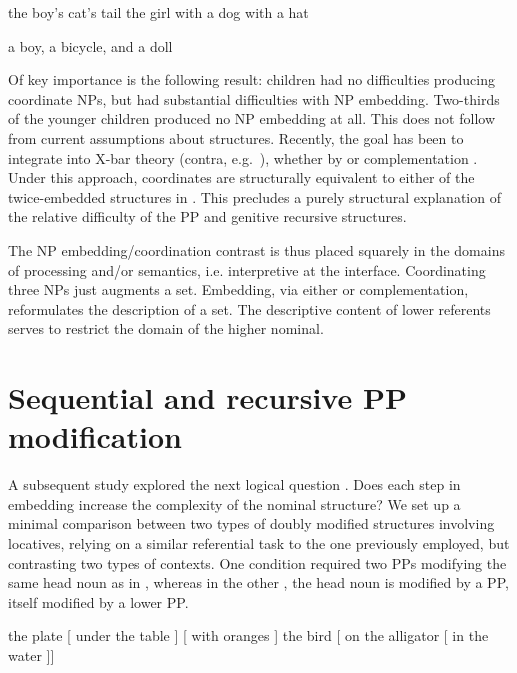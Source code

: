 \documentclass[output=paper]{langsci/langscibook}
\begin{document}
\ea\label{ex:key:1}
    \ea\label{ex:key:1a} the boy’s cat’s tail
    \ex\label{ex:key:1b} the girl with a dog with a hat
    \z
\z

\ea\label{ex:key:2}
    a boy, a bicycle, and a doll
\z

Of key importance is the following result: children had no difficulties
producing coordinate NPs, but had substantial difficulties with NP embedding.
Two-thirds of the younger children produced no NP embedding at all. This does
not follow from current assumptions about  structures.
Recently, the goal has been to integrate  into X-bar theory
(contra, e.g.\ \citealt{Jackendoff1977}), whether by  \citep{Munn1993}
or complementation \citep{Johannessen1998}. Under this approach, coordinates
are structurally equivalent to either of the twice-embedded structures in
. This precludes a purely structural explanation of the relative
difficulty of the PP and genitive recursive
structures.

The NP embedding/coordination contrast is thus placed squarely in the domains
of processing and/or semantics, i.e. interpretive  at the interface.
Coordinating three NPs just augments a set. Embedding, via either  or
complementation, reformulates the description of a set. The descriptive content
of lower referents serves to restrict the domain of the higher nominal.

\section{Sequential and recursive PP modification}

A subsequent study explored the next logical question
\parencite{Perez-LerouxEtAl2018b}. Does each step in embedding increase the
complexity of the nominal structure? We set up a minimal comparison between two
types of doubly modified structures involving locatives, relying on a similar
referential task to the one previously employed, but contrasting two types of
contexts. One condition required two PPs modifying the same head noun as in
, whereas in the other , the head noun is
modified by a PP, itself modified by a lower PP.

\ea\label{ex:key:3}
    \ea\label{ex:key:3a} the plate [ under the table ] [ with oranges ]
    \ex\label{ex:key:3b} the bird [ on the alligator [ in the water ]]
    \z
\z
\end{document}
